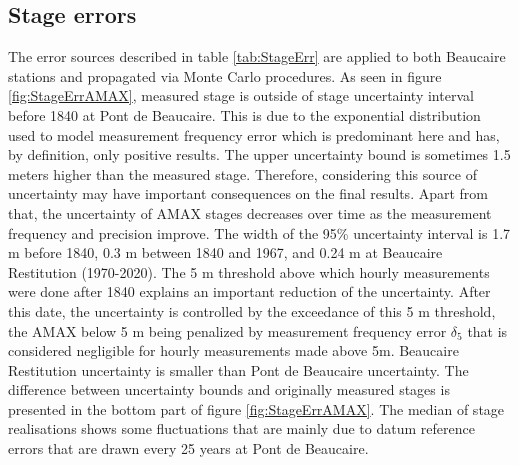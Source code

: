 \documentclass[11pt]{article}
\begin{document}
    \subsection{Stage errors}
    \label{sec:StageErrRes}
    
    The error sources described in table \ref{tab:StageErr} are applied to both Beaucaire stations and propagated via Monte Carlo procedures. As seen in figure \ref{fig:StageErrAMAX}, measured stage is outside of stage uncertainty interval before 1840 at Pont de Beaucaire. This is due to the exponential distribution used to model measurement frequency error which is predominant here and has, by definition, only positive results. The upper uncertainty bound is sometimes 1.5 meters higher than the measured stage. Therefore, considering this source of uncertainty may have important consequences on the final results. Apart from that, the uncertainty of AMAX stages decreases over time as the measurement frequency and precision improve. The width of the 95\% uncertainty interval is 1.7 m before 1840, 0.3 m between 1840 and 1967, and 0.24 m at Beaucaire Restitution (1970-2020). The 5 m threshold above which hourly measurements were done after 1840 explains an important reduction of the uncertainty. After this date, the uncertainty is controlled by the exceedance of this 5 m threshold, the AMAX below 5 m being penalized by measurement frequency error $\delta_5$ that is considered negligible for hourly measurements made above 5m. Beaucaire Restitution uncertainty is smaller than Pont de Beaucaire uncertainty. The difference between uncertainty bounds and originally measured stages is presented in the bottom part of figure \ref{fig:StageErrAMAX}. The median of stage realisations shows some fluctuations that are mainly due to datum reference errors that are drawn every 25 years at Pont de Beaucaire.
    
\end{document}
